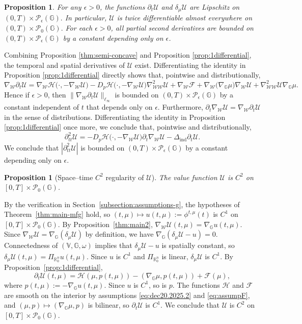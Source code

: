 \documentclass[10pt]{article}
\newtheorem{proposition}[theorem]{Proposition}
\numberwithin{equation}{section}
\newcommand{\cF}{ \mathcal{F}}
\newcommand{\cH}{ \mathcal{H}}
\newcommand{\cP}{ \mathcal{P}}
\newcommand{\cU}{ \mathcal{U}}
\newcommand{\cW}{ \mathcal{W}}
\newcommand{\bR}{\mathbb R}
\newcommand{\bV}{\mathbb V}
\def\cH{\mathcal{H}}
\def\G{\mathbb{G}}
\begin{document}
%
%
%
\begin{proposition}\label{thm:main3} For any $\epsilon>0$, the functions $\partial_t \cU$ and $\delta_{\mu} \cU$ are Lipschitz on $(0, T) \times \cP_\epsilon(\G).$ In particular, $\cU$ is twice differentiable almost everywhere on $(0, T) \times \cP_0(\G).$ For each $\epsilon>0$, all partial second derivatives are bounded on $(0, T) \times \cP_\epsilon(\G)$ by a constant depending only on $\epsilon$.
\end{proposition}
%
\proof{} Combining Proposition \ref{thm:semi-concave} and Proposition \ref{prop:1differential}, the temporal and spatial derivatives of $\cU$ exist. Differentiating the identity in Proposition \ref{prop:1differential} directly shows that, pointwise and distributionally, 
\[
\nabla_{\cW} \partial_t \cU = \nabla_{\cW}\cH\big(\cdot, -\nabla_{\cW}\cU\big) - D_p \cH\big(\cdot, -\nabla_{\cW}\cU\big)\nabla^2_{\cW\cW}\cU + \nabla_{\cW} \cF +
\nabla_{\cW}\big(\nabla_\G \mu\big)\nabla_{\cW} \cU + \nabla^2_{\cW\cW} \cU \nabla_\G \mu.
\]
Hence if $\epsilon>0$, then $\|\nabla_{\cW} \partial_t \cU\|_{\ell_\infty}$ is bounded on $(0, T) \times \cP_\epsilon(\G)$ by a constant independent of $t$ that depends only on $\epsilon$. Furthermore, $\partial_t \nabla_{\cW} \cU=\nabla_{\cW} \partial_t \cU$ in the sense of distributions. Differentiating the identity in Proposition \ref{prop:1differential} once more, we conclude that, pointwise and distributionally, 
\[
\partial^2_{tt} \cU = -D_p \cH\big(\cdot, -\nabla_{\cW}\cU\big) \partial_t \nabla_{\cW}\cU - \Delta_\text{ind}\partial_t \cU.
\]
We conclude that $|\partial^2_{tt} \cU|$ is bounded on $(0, T) \times \cP_\epsilon(\G)$ by a constant depending only on $\epsilon$. \endproof


%
%
\begin{proposition}[Space--time $C^{2}$ regularity of $\cU$]\label{thm:C2-regularity}
The value function $\cU$ is $C^2$ on $[0,T]\times \cP_0(\G)$.
\end{proposition}
%
\proof{}
By the verification in Section~\ref{subsection:assumptions-g}, the hypotheses of Theorem~\ref{thm:main-mfg} hold, so $(t,\mu) \mapsto u(t,\mu):=\phi^{t,\mu}(t)$ is $C^1$ on $[0,T]\times\cP_0(\G)$. By Proposition~\ref{thm:main2}, $\nabla_\cW \cU(t,\mu)=\nabla_\G u(t,\mu)$. Since $\nabla_\cW \cU=\nabla_\G(\delta_\mu \cU)$ by definition, we have $\nabla_\G(\delta_\mu \cU - u)=0$. Connectedness of $(\bV,\G,\omega)$ implies that $\delta_\mu \cU - u$ is spatially constant, so $\delta_\mu \cU(t,\mu)=\Pi_{\bR^n_0} u(t,\mu)$. Since $u$ is $C^1$ and $\Pi_{\bR^n_0}$ is linear, $\delta_\mu \cU$ is $C^1$. By Proposition~\ref{prop:1differential},
\[
\partial_t \cU(t,\mu) = \cH(\mu,p(t,\mu))-(\nabla_\G \mu,p(t,\mu))+\cF(\mu),
\]
where $p(t,\mu):=-\nabla_\G u(t,\mu)$. Since $u$ is $C^1$, so is $p$. The functions $\cH$ and $\cF$ are smooth on the interior by assumptions \eqref{eq:dec20.2025.2} and \eqref{eq:assumpF}, and $(\mu,p)\mapsto(\nabla_\G\mu,p)$ is bilinear, so $\partial_t\cU$ is $C^1$.
We conclude that $\cU$ is $C^2$ on $[0,T]\times\cP_0(\G)$.
\endproof
\end{document}
